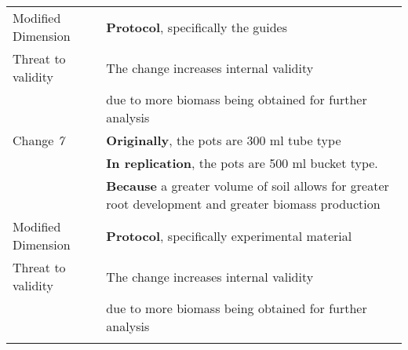 \begin{table*}[h]
\begin{tabularx}{\textwidth}{
  >{\hsize=0.25\hsize}X
  >{\hsize=0.8\hsize}X}
     Modified Dimension & 
    \textbf{Protocol}, specifically the guides \\   
   Threat to validity  & The change increases internal validity \\ & due to more biomass being obtained for further analysis\\ 
\hline
    Change \textit{7}   & \textbf{Originally}, the pots are 300 ml tube type \\& \textbf{In replication}, the pots are 500 ml bucket type. \\& \textbf{Because} a greater volume of soil allows for greater root development and greater biomass production \\
    
     Modified Dimension & 
    \textbf{Protocol}, specifically experimental
    material \\   
    Threat to validity  & The change increases internal validity \\ & due to more biomass being obtained for further analysis\\  
    
	\noalign{\smallskip\smallskip}\hline
	\end{tabularx}  
\end{table*}
